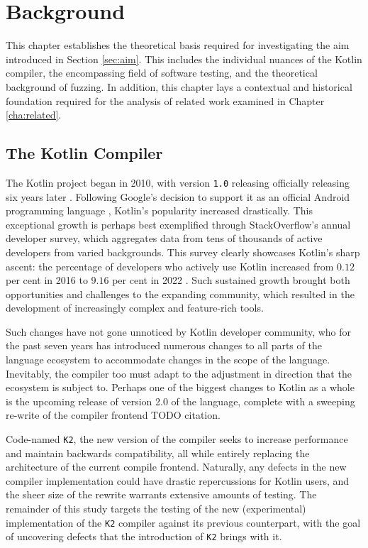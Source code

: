 \chapter{\label{cha:background}Background} 

This chapter establishes the theoretical basis
required for investigating the aim introduced in
Section \ref{sec:aim}.
This includes the individual nuances of the Kotlin compiler,
the encompassing field of software testing, and the theoretical
background of fuzzing.
In addition, this chapter lays a contextual and historical foundation
required for the analysis of related work examined in Chapter \ref{cha:related}.

\section{The Kotlin Compiler}

The Kotlin project began in 2010, with version \texttt{1.0} releasing
officially releasing six years later \citep{stepanov2021type}.
Following Google's decision to support it as an official Android
programming language \cite{kotlin5years}, Kotlin's popularity increased drastically.
This exceptional growth is perhaps best exemplified through
StackOverflow's annual developer survey, which aggregates data from
tens of thousands of active developers from varied backgrounds.
This survey clearly showcases Kotlin's sharp ascent: the percentage of
developers who actively use Kotlin increased from $0.12$ per cent in 2016
to $9.16$ per cent in 2022 \citep{sosurvey2016, sosurvey2022}. 
Such sustained growth brought both opportunities and challenges to the
expanding community, which resulted in the development of increasingly
complex and feature-rich tools.

Such changes have not gone unnoticed by Kotlin developer
community, who for the past seven years has introduced numerous
changes to all parts of the language ecosystem to
accommodate changes in the scope of the language.
Inevitably, the compiler too must adapt to the adjustment
in direction that the ecosystem is subject to.
Perhaps one of the biggest changes to Kotlin as a whole
is the upcoming release of version 2.0 of the language,
complete with a sweeping re-write of the compiler frontend TODO citation.

Code-named \texttt{K2}, the new version of the compiler seeks
to increase performance and maintain backwards compatibility,
all while entirely replacing the architecture of the current compile frontend.
Naturally, any defects in the new compiler implementation
could have drastic repercussions for Kotlin users, and the
sheer size of the rewrite warrants extensive amounts of testing.
The remainder of this study targets the testing of the new
(experimental) implementation of the \texttt{K2} compiler
against its previous counterpart, with the goal
of uncovering defects that the introduction of \texttt{K2} brings with it.

